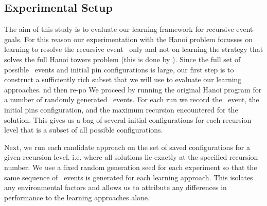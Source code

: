 
\subsection{Experimental Setup} \label{sec:setup}

The aim of this study is to evaluate our learning framework for recursive event-goals. For this reason our experimentation with the Hanoi problem focusses on learning to resolve the recursive event \eSolve\ only and not on learning the strategy that solves the full Hanoi towers problem (this is done by ). Since the full set of possible \eSolve\  events and initial pin configurations is large, our first step is to construct a sufficiently rich subset that we will use to evaluate our learning approaches. 
nd then re-po
We proceed by running the original Hanoi program for a number of randomly generated \eSolve\  events. For each run we record the \eSolve\  event, the initial pins configuration, and the maximum recursion encountered for the solution. This gives us a bag of several initial configurations for each recursion level that is a subset of all possible configurations. 

Next, we run each candidate approach on the set of saved configurations for a given recursion level. i.e. where all solutions lie exactly at the specified recursion number. We use a fixed random generation seed for each experiment so that the same sequence of \eSolve\  events is generated for each learning approach. This isolates any environmental factors and allows us to attribute any differences in performance to the learning approaches alone.

